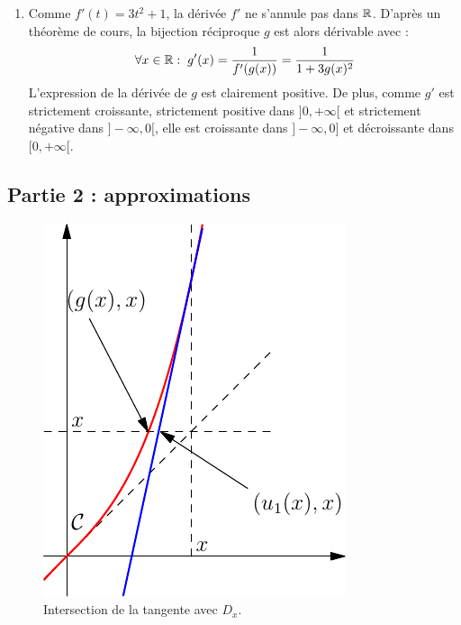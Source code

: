 \begin{enumerate}
 \item Comme $f'(t)=3t^2+1$, la dérivée $f'$ ne s'annule pas dans $\mathbb{R}$. D'après un théorème de cours, la bijection réciproque $g$ est alors dérivable avec :
\begin{displaymath}
 \forall x\in \mathbb{R}:\; g'(x)=\frac{1}{f'(g(x))}=\frac{1}{1+3g(x)^2}
\end{displaymath}
L'expression de la dérivée de $g$ est clairement positive. De plus, comme $g'$ est strictement croissante, strictement positive dans $]0,+\infty[$ et strictement négative dans $]-\infty, 0 [$, elle est croissante dans $]-\infty,0]$ et décroissante dans $[0,+\infty[$.
\end{enumerate}

\subsection*{Partie 2 : approximations}
\begin{figure}[h!]
 \centering
 \includegraphics{Capproxrec_2.pdf}
 \caption{Intersection de la tangente avec $D_x$.}
 \label{fig:Capproxrec_2}
\end{figure}
